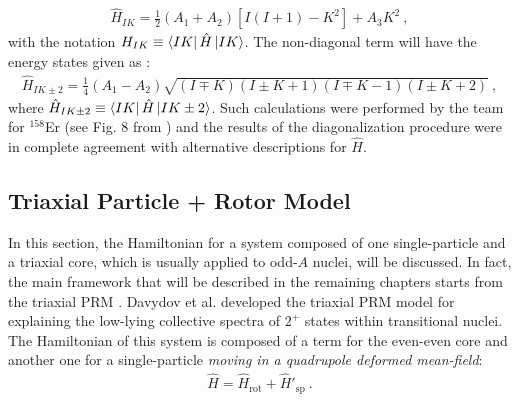\begin{align}
    \hat{H}_{IK}=\frac{1}{2}(A_1+A_2)\left[I(I+1)-K^2\right]+A_3K^2\ ,
\end{align}
with the notation $H_{IK}\equiv\bra{IK}\hat{H}\ket{IK}$. The non-diagonal term will have the energy states given as \cite{wen2015wobbling}:
\begin{align}
    \hat{H}_{IK\pm2}=\frac{1}{4}(A_1-A_2)\sqrt{(I\mp K)(I\pm K +1)(I \mp K -1)(I\pm K +2)}\ ,
\end{align}
where $\hat{H}_{IK\pm 2}\equiv \bra{IK}\hat{H}\ket{IK\pm 2}$. %
Such calculations were performed by the team for $^{158}$Er (see Fig. 8 from  \cite{raduta2017semiclassical}) and the results of the diagonalization procedure were in complete agreement with alternative descriptions for $\hat{H}$.

\subsection{Triaxial Particle + Rotor Model}
\label{tprm-model}

In this section, the Hamiltonian for a system composed of one single-particle and a triaxial core, which is usually applied to odd-$A$ nuclei, will be discussed. In fact, the main framework that will be described in the remaining chapters starts from the triaxial PRM \cite{davydov1958rotational}. Davydov et al. developed the triaxial PRM model for explaining the low-lying collective spectra of $2^+$ states within transitional nuclei. The Hamiltonian of this system is composed of a term for the even-even core and another one for a single-particle \emph{moving in a quadrupole deformed mean-field}:
\begin{align}
    \hat{H}=\hat{H}_\text{rot}+\hat{H}'_\text{sp}\ .
    \label{triaxial-prm-general-hamiltonian}
\end{align}

